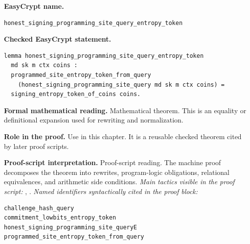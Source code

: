 \begin{formaltheorem}
\noindent\textbf{EasyCrypt name.}
\begin{lstlisting}[language=EasyCrypt,basicstyle=\ttfamily\scriptsize]
honest_signing_programming_site_query_entropy_token
\end{lstlisting}
\noindent\textbf{Checked EasyCrypt statement.}
\begin{lstlisting}[language=EasyCrypt,basicstyle=\ttfamily\scriptsize]
lemma honest_signing_programming_site_query_entropy_token
  md sk m ctx coins :
  programmed_site_entropy_token_from_query
    (honest_signing_programming_site_query md sk m ctx coins) =
  signing_entropy_token_of_coins coins.
\end{lstlisting}
\noindent\textbf{Formal mathematical reading.}
Mathematical theorem. This is an equality or definitional expansion used for rewriting and normalization.

\noindent\textbf{Role in the proof.}
Use in this chapter. It is a reusable checked theorem cited by later proof scripts.

\noindent\textbf{Proof-script interpretation.}
Proof-script reading. The machine proof decomposes the theorem into rewrites, program-logic obligations, relational equivalences, and arithmetic side conditions.
\emph{Main tactics visible in the proof script:} , .
\emph{Named identifiers syntactically cited in the proof block:}
\begin{lstlisting}[language=EasyCrypt,basicstyle=\ttfamily\scriptsize]
challenge_hash_query
commitment_lowbits_entropy_token
honest_signing_programming_site_queryE
programmed_site_entropy_token_from_query
\end{lstlisting}

\end{formaltheorem}

